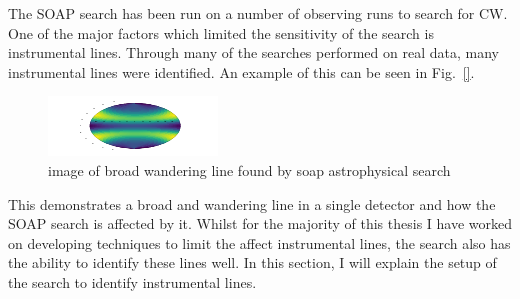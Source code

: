 The SOAP search has been run on a number of observing runs to search for \ac{CW}. 
One of the major factors which limited the sensitivity of the search is instrumental lines. 
Through many of the searches performed on real data, many instrumental lines were identified. 
An example of this can be seen in Fig.~\ref{}.
\begin{figure}[h]
	\includegraphics[width=\textwidth]{testimg.png}
	\caption{image of broad wandering line found by soap astrophysical search}
	\label{detchar:soap:astrowander}
\end{figure}
This demonstrates a broad and wandering line in a single detector and how the SOAP search is affected by it. 
Whilst for the majority of this thesis I have worked on developing techniques to limit the affect instrumental lines, the search also has the ability to identify these lines well.
In this section, I will explain the setup of the search to identify instrumental lines.

